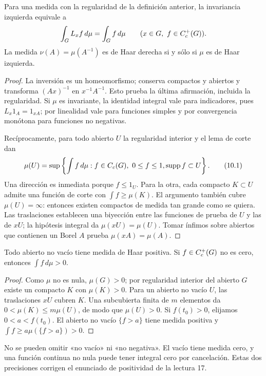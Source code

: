 \begin{proposicion}\label{v4:haar-integral}
Para una medida con la regularidad de la definición anterior, la invariancia izquierda equivale a
\[
 \int_G L_xf\,d\mu=\int_G f\,d\mu
 \qquad(x\in G,\ f\in C_c^+(G)).
\]
La medida $\nu(A)=\mu(A^{-1})$ es de Haar derecha si y sólo si $\mu$ es de Haar izquierda.
\end{proposicion}
\begin{proof}
La inversión es un homeomorfismo; conserva compactos y abiertos y transforma $(Ax)^{-1}$ en $x^{-1}A^{-1}$. Esto prueba la última afirmación, incluida la regularidad. Si $\mu$ es invariante, la identidad integral vale para indicadores, pues $L_x1_A=1_{xA}$; por linealidad vale para funciones simples y por convergencia monótona para funciones no negativas.

Recíprocamente, para todo abierto $U$ la regularidad interior y el lema de corte dan
\[
 \mu(U)=\sup\left\{\int f\,d\mu: f\in\Cc(G),\ 0\leq f\leq1,
       \supp f\subset U\right\}.                     \tag{10.1}\label{v4:haar-abiertos}
\]
Una dirección es inmediata porque $f\leq1_U$. Para la otra, cada compacto $K\subset U$ admite una función de corte con $\int f\geq\mu(K)$. El argumento también cubre $\mu(U)=\infty$: entonces existen compactos de medida tan grande como se quiera. Las traslaciones establecen una biyección entre las funciones de prueba de $U$ y las de $xU$; la hipótesis integral da $\mu(xU)=\mu(U)$. Tomar ínfimos sobre abiertos que contienen un Borel $A$ prueba $\mu(xA)=\mu(A)$.
\end{proof}

\begin{proposicion}[Positividad]\label{v4:haar-positividad}
Todo abierto no vacío tiene medida de Haar positiva. Si $f\in C_c^+(G)$ no es cero, entonces $\int f\,d\mu>0$.
\end{proposicion}
\begin{proof}
Como $\mu$ no es nula, $\mu(G)>0$; por regularidad interior del abierto $G$ existe un compacto $K$ con $\mu(K)>0$. Para un abierto no vacío $U$, las traslaciones $xU$ cubren $K$. Una subcubierta finita de $m$ elementos da $0<\mu(K)\leq m\mu(U)$, de modo que $\mu(U)>0$. Si $f(t_0)>0$, elijamos $0<a<f(t_0)$. El abierto no vacío $\{f>a\}$ tiene medida positiva y $\int f\geq a\mu(\{f>a\})>0$.
\end{proof}
\begin{observacion}
No se pueden omitir «no vacío» ni «no negativa». El vacío tiene medida cero, y una función continua no nula puede tener integral cero por cancelación. Estas dos precisiones corrigen el enunciado de positividad de la lectura 17.
\end{observacion}

